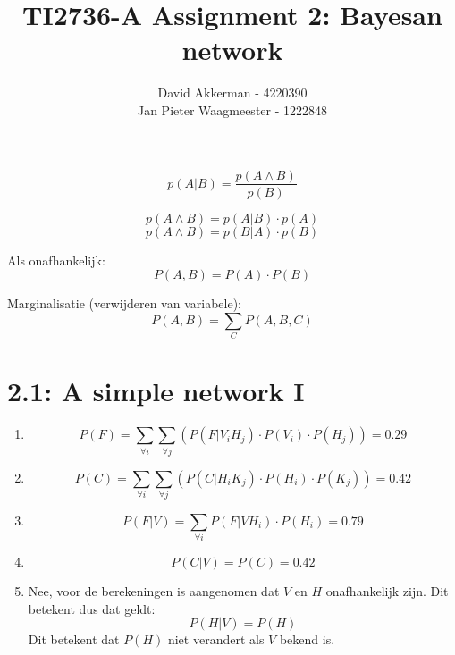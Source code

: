 \documentclass[a4paper,10pt,fleqn]{article}
\title{TI2736-A Assignment 2:  Bayesan network}
\author{
	David Akkerman - 4220390 \\
	Jan Pieter Waagmeester - 1222848 \\
}
\begin{document}
\maketitle


$$ p(A | B) = \frac{p(A \wedge B)}{p(B)}$$

$$ p(A \wedge B) = p(A|B) \cdot p(A)$$
$$ p(A \wedge B) = p(B|A) \cdot p(B)$$

Als onafhankelijk:
$$P(A, B) = P(A) \cdot P(B)$$

Marginalisatie (verwijderen van variabele):
 $$P(A, B) = \sum_C P(A, B, C)$$

\section*{2.1: A simple network I}
\begin{enumerate}[1.]
	\item $$P(F) = \sum_{\forall i} \sum_{\forall j} (P(F|V_iH_j) \cdot P(V_i) \cdot P(H_j)) = 0.29$$

	\item $$P(C) = \sum_{\forall i} \sum_{\forall j} (P(C|H_iK_j) \cdot P(H_i) \cdot P(K_j)) = 0.42 $$


	\item $$P(F|V) = \sum_{\forall i} P(F|VH_i) \cdot P(H_i) = 0.79	$$

	\item $$P(C|V) = P(C) = 0.42$$

	\item Nee, voor de berekeningen is aangenomen dat $V$ en $H$ onafhankelijk zijn. Dit betekent dus dat geldt: $$P(H|V) = P(H)$$ Dit betekent dat $P(H)$ niet verandert als $V$ bekend is.


\end{enumerate}
\end{document}
